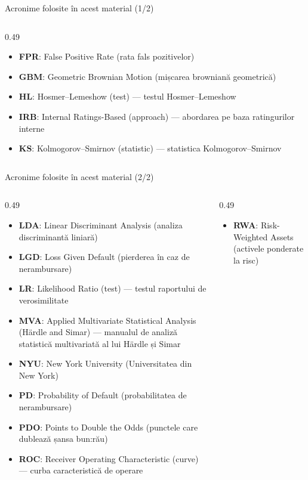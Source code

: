 \begin{frame}{Acronime folosite în acest material (1/2)}
\begin{columns}[T]
\begin{column}{0.49\textwidth}
\begin{itemize}
    \item \textbf{FPR}: False Positive Rate (rata fals pozitivelor)
    \item \textbf{GBM}: Geometric Brownian Motion (mișcarea browniană geometrică)
    \item \textbf{HL}: Hosmer–Lemeshow (test) — testul Hosmer–Lemeshow
    \item \textbf{IRB}: Internal Ratings-Based (approach) — abordarea pe baza ratingurilor interne
    \item \textbf{KS}: Kolmogorov–Smirnov (statistic) — statistica Kolmogorov–Smirnov
\end{itemize}
\end{column}
\end{columns}
\end{frame}
\begin{frame}{Acronime folosite în acest material (2/2)}
\begin{columns}[T]
\begin{column}{0.49\textwidth}
\begin{itemize}\setlength{\itemsep}{0pt}
    \item \textbf{LDA}: Linear Discriminant Analysis (analiza discriminantă liniară)
    \item \textbf{LGD}: Loss Given Default (pierderea în caz de nerambursare)
    \item \textbf{LR}: Likelihood Ratio (test) — testul raportului de verosimilitate
    \item \textbf{MVA}: Applied Multivariate Statistical Analysis (Härdle and Simar) — manualul de analiză statistică multivariată al lui Härdle și Simar
    \item \textbf{NYU}: New York University (Universitatea din New York)
    \item \textbf{PD}: Probability of Default (probabilitatea de nerambursare)
    \item \textbf{PDO}: Points to Double the Odds (punctele care dublează șansa bun:rău)
    \item \textbf{ROC}: Receiver Operating Characteristic (curve) — curba caracteristică de operare
\end{itemize}
\end{column}
\begin{column}{0.49\textwidth}
\begin{itemize}\setlength{\itemsep}{0pt}
    \item \textbf{RWA}: Risk-Weighted Assets (activele ponderate la risc)

\end{itemize}
\end{column}
\end{columns}
\end{frame}
